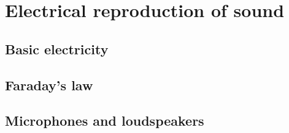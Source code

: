 \section{Electrical reproduction of sound}

\subsection{Basic electricity}

\subsection{Faraday's law}

\subsection{Microphones and loudspeakers}

